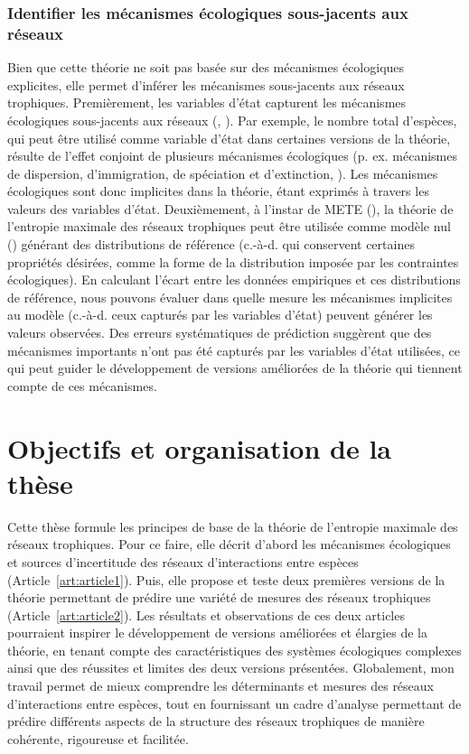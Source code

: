 \subsubsection{Identifier les mécanismes écologiques sous-jacents aux réseaux} 

Bien que cette théorie ne soit pas basée sur des mécanismes écologiques
explicites, elle permet d'inférer les mécanismes sous-jacents aux réseaux
trophiques. Premièrement, les variables d'état capturent les mécanismes
écologiques sous-jacents aux réseaux (\cite{White2012Characterizing},
\cite{McGill2010Mechanisms}). Par exemple, le nombre total d'espèces, qui peut
être utilisé comme variable d'état dans certaines versions de la théorie,
résulte de l'effet conjoint de plusieurs mécanismes écologiques (p. ex.
mécanismes de dispersion, d'immigration, de spéciation et d'extinction,
\cite{Whittaker2001Scale}). Les mécanismes écologiques sont donc implicites dans
la théorie, étant exprimés à travers les valeurs des variables d'état.
Deuxièmement, à l'instar de METE (\cite{Harte2014Maximum}), la théorie de
l'entropie maximale des réseaux trophiques peut être utilisée comme modèle nul
(\cite{Fortuna2006Habitat}) générant des distributions de référence (c.-à-d. qui
conservent certaines propriétés désirées, comme la forme de la distribution
imposée par les contraintes écologiques). En calculant l'écart entre les données
empiriques et ces distributions de référence, nous pouvons évaluer dans quelle
mesure les mécanismes implicites au modèle (c.-à-d. ceux capturés par les
variables d'état) peuvent générer les valeurs observées. Des erreurs
systématiques de prédiction suggèrent que des mécanismes importants n'ont pas
été capturés par les variables d'état utilisées, ce qui peut guider le
développement de versions améliorées de la théorie qui tiennent compte de ces
mécanismes. 


\section{Objectifs et organisation de la thèse} 

Cette thèse formule les principes de base de la théorie de l'entropie maximale
des réseaux trophiques. Pour ce faire, elle décrit d'abord les mécanismes
écologiques et sources d'incertitude des réseaux d'interactions entre espèces
(Article~\ref{art:article1}). Puis, elle propose et teste deux premières
versions de la théorie permettant de prédire une variété de mesures des réseaux
trophiques (Article~\ref{art:article2}). Les résultats et observations de ces
deux articles pourraient inspirer le développement de versions améliorées et
élargies de la théorie, en tenant compte des caractéristiques des systèmes
écologiques complexes ainsi que des réussites et limites des deux versions
présentées. Globalement, mon travail permet de mieux comprendre les déterminants
et mesures des réseaux d'interactions entre espèces, tout en fournissant un
cadre d'analyse permettant de prédire différents aspects de la structure des
réseaux trophiques de manière cohérente, rigoureuse et facilitée.

